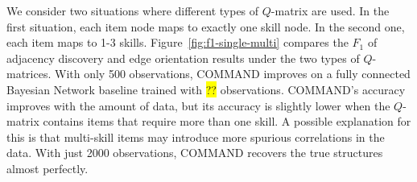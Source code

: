 \documentclass{edm_template}
\newcommand{\hl}[1]{\colorbox{yellow}{#1}}
\begin{document}
	We consider two situations where different types of $Q$-matrix are used. In the first situation,
	each item node maps to exactly one skill node. In the second one, each item maps to 1-3 skills. 
	Figure~\ref{fig:f1-single-multi} compares the $F_1$ of adjacency discovery and edge orientation results under the two types of $Q$-matrices.
	With only 500 observations, COMMAND improves on a fully connected Bayesian Network baseline trained with \hl{??} observations.
	COMMAND's  accuracy  improves with the amount of data, but its accuracy is slightly lower when the $Q$-matrix contains items that require more than one skill. %
	A possible explanation for this is that multi-skill items may introduce more spurious correlations in the data.
	With just 2000 observations, COMMAND  recovers the true structures almost perfectly.
	
\end{document}
